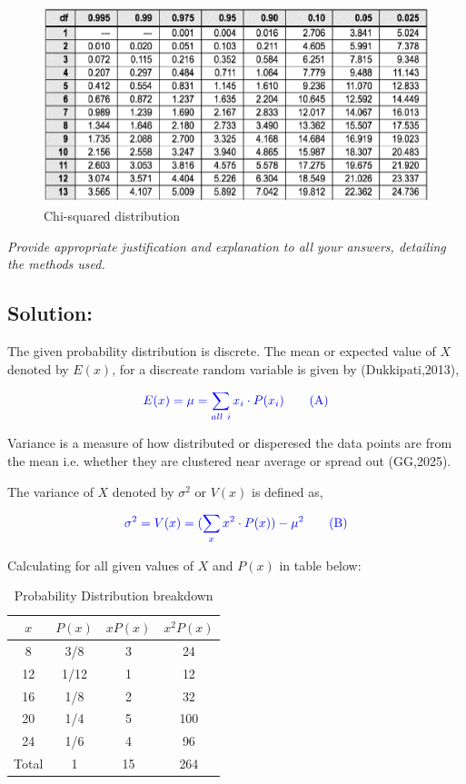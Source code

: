 \documentclass[a4paper]{report}
\begin{document}
\begin{figure}[h]
    \centering
    \includegraphics[width=0.5\linewidth]{chi.png}
    \caption{Chi-squared distribution}
    \label{fig:enter-label}
\end{figure}

 \textit{Provide appropriate justification and explanation to all your answers, detailing the methods used.}

\subsection*{Solution:}

The given probability distribution is discrete. The mean or expected value of $X$ denoted by $E(x)$, for a discreate random variable is given by (Dukkipati,2013),

\begin{equation*}
    \color{blue} E(x)=\mu = \sum_{all\ i} x_i\cdot P(x_i) \tag{A}
\end{equation*}

Variance is a measure of how distributed or disperesed the data points are from the mean i.e. whether they are clustered near average or spread out (GG,2025). 

The variance of $X$ denoted by $\sigma ^2$ or $V(x)$ is defined as,

\begin{equation*}
    \color{blue} \sigma ^2 = V(x) = ({\sum_{x} x^2\cdot P(x)}) -\mu ^2 \tag{B}
\end{equation*}

Calculating for all given values of $X$ and $P(x)$ in table below:

\begin{table}[h]
    \centering
    \begin{tabular}{|c|c|c|c|}
        \hline
        $x$ & $P(x)$ & $xP(x)$ & $x^2P(x)$ \\ \hline
        8 & 3/8 & 3 & 24 \\ \hline
        12 & 1/12 & 1  & 12 \\ \hline
        16 & 1/8 & 2 & 32 \\ \hline
        20 & 1/4 & 5 & 100 \\ \hline
        24 & 1/6 & 4 &  96\\ \hline
        Total & 1 & 15 & 264 \\ \hline
    \end{tabular}
    \caption{Probability Distribution breakdown}
    \label{tab:sample_table}
\end{table}
\end{document}
